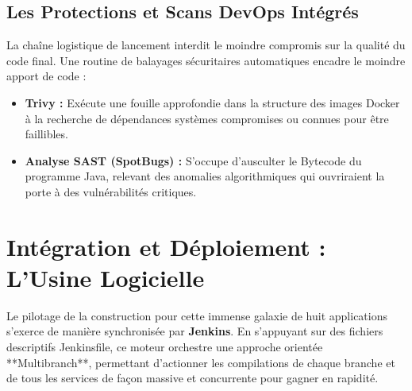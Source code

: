 \documentclass[12pt,a4paper]{article}
\begin{document}
\subsection{Les Protections et Scans DevOps Intégrés}
La chaîne logistique de lancement interdit le moindre compromis sur la qualité du code final. Une routine de balayages sécuritaires automatiques encadre le moindre apport de code :
\begin{itemize}
    \item \textbf{Trivy :} Exécute une fouille approfondie dans la structure des images Docker à la recherche de dépendances systèmes compromises ou connues pour être faillibles.
    \item \textbf{Analyse SAST (SpotBugs) :} S'occupe d'ausculter le Bytecode du programme Java, relevant des anomalies algorithmiques qui ouvriraient la porte à des vulnérabilités critiques.
\end{itemize}


\section{Intégration et Déploiement : L'Usine Logicielle}

Le pilotage de la construction pour cette immense galaxie de huit applications s'exerce de manière synchronisée par \textbf{Jenkins}. En s'appuyant sur des fichiers descriptifs Jenkinsfile, ce moteur orchestre une approche orientée **Multibranch**, permettant d'actionner les compilations de chaque branche et de tous les services de façon massive et concurrente pour gagner en rapidité.
\end{document}
